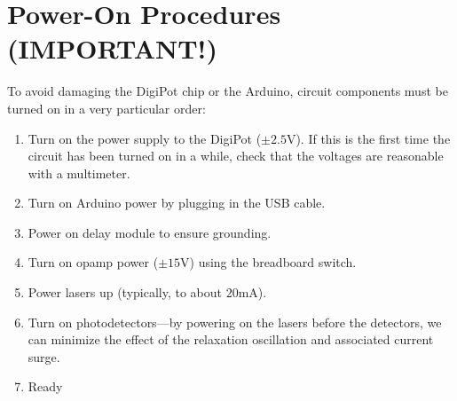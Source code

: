 \documentclass{article}
\begin{document}
    \tableofcontents
    \newpage

    \section{Power-On Procedures (IMPORTANT!)}
    To avoid damaging the DigiPot chip or the Arduino, circuit components must be turned on in a very particular order:
    \begin{enumerate}
        \item Turn on the power supply to the DigiPot ($\pm2.5$V). If this is the first time the circuit has been turned on in a while, check that the voltages are reasonable with a multimeter.
        \item Turn on Arduino power by plugging in the USB cable.
        \item Power on delay module to ensure grounding.
        \item Turn on opamp power ($\pm15$V) using the breadboard switch.
        \item Power lasers up (typically, to about $20$mA).
        \item Turn on photodetectors---by powering on the lasers before the detectors, we can minimize the effect of the relaxation oscillation and associated current surge.
        \item Ready
    \end{enumerate}
\end{document}
